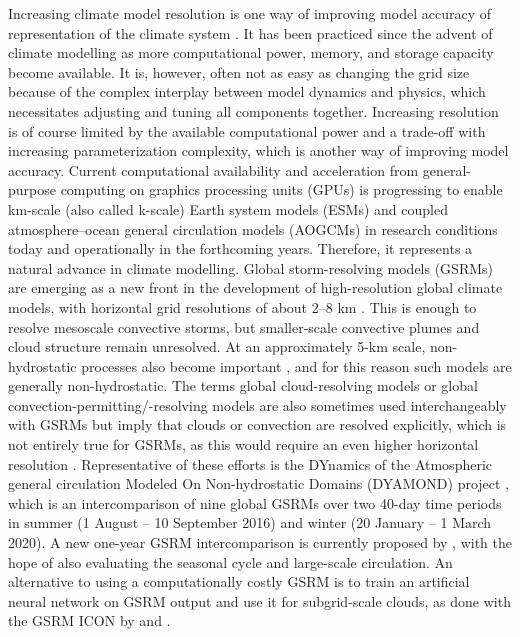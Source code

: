 \documentclass[draft]{agujournal2019}
\begin{document}
Increasing climate model resolution is one way of improving model accuracy of
representation of the climate system . It has been
practiced since the advent of climate modelling as more computational power,
memory, and storage capacity become available. It is, however, often not as
easy as changing the grid size because of the complex interplay between model
dynamics and physics, which necessitates adjusting and tuning all components
together.  Increasing resolution is of course limited by the available
computational power and a trade-off with increasing parameterization
complexity, which is another way of improving model accuracy.  Current
computational availability and acceleration from general-purpose computing on
graphics processing units (GPUs) is progressing to enable km-scale (also called
k-scale) Earth system models (ESMs) and coupled atmosphere--ocean general
circulation models (AOGCMs) in research conditions today and operationally in
the forthcoming years.  Therefore, it represents a natural advance in climate
modelling.  Global storm-resolving models (GSRMs) are emerging as a new front
in the development of high-resolution global climate models, with horizontal
grid resolutions of about 2--8 km . This is enough
to resolve mesoscale convective storms, but smaller-scale convective plumes and
cloud structure remain unresolved. At an approximately 5-km scale,
non-hydrostatic processes also become important , and for
this reason such models are generally non-hydrostatic. The terms global
cloud-resolving models or global convection-permitting/-resolving models are
also sometimes used interchangeably with GSRMs but imply that clouds or
convection are resolved explicitly, which is not entirely true for GSRMs, as
this would require an even higher horizontal resolution .
Representative of these efforts is the DYnamics of the Atmospheric general
circulation Modeled On Non-hydrostatic Domains (DYAMOND) project
, which is an intercomparison of nine global GSRMs
over two 40-day time periods in summer (1 August -- 10 September 2016) and
winter (20 January -- 1 March 2020). A new one-year GSRM intercomparison is
currently proposed by , with the hope of also evaluating the
seasonal cycle and large-scale circulation.  An alternative to using a
computationally costly GSRM is to train an artificial neural network on GSRM
output and use it for subgrid-scale clouds, as done with the GSRM ICON by
 and .
\end{document}
